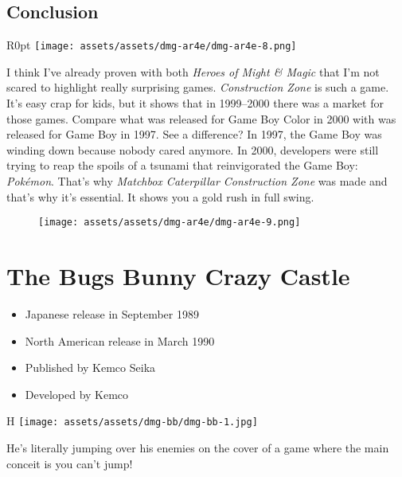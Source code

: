 \documentclass{book}
\begin{document}
\FloatBarrier\needspace{5pt}\section*{Conclusion}\nopagebreak[4]

\begin{wrapfigure}{R}{0pt} \texttt{[image: assets/assets/dmg-ar4e/dmg-ar4e-8.png]}\end{wrapfigure}
I think I’ve already proven with both \emph{Heroes of Might \& Magic} that I’m not scared to highlight really surprising games. \emph{Construction Zone} is such a game. It’s easy crap for kids, but it shows that in 1999–2000 there was a market for those games. Compare what was released for Game Boy Color in 2000 with was released for Game Boy in 1997. See a difference? In 1997, the Game Boy was winding down because nobody cared anymore. In 2000, developers were still trying to reap the spoils of a tsunami that reinvigorated the Game Boy: \emph{Pokémon}. That’s why \emph{Matchbox Caterpillar Construction Zone} was made and that’s why it’s essential. It shows you a gold rush in full swing.

\begin{figure}[hbt]
\vskip 10pt
\centering \texttt{[image: assets/assets/dmg-ar4e/dmg-ar4e-9.png]}
\vskip 6pt
\end{figure}


\begingroup \chapter*{The Bugs Bunny Crazy Castle} \endgroup

\begin{itemize} \setlength\itemsep{-0.4em}
\item Japanese release in September 1989
\item North American release in March 1990
\item Published by Kemco Seika
\item Developed by Kemco
\end{itemize}\noindent

\begin{wrapfigure}{H}{\linewidth}
\vskip 4pt
\centering \texttt{[image: assets/assets/dmg-bb/dmg-bb-1.jpg]}\par\pagetwodescription He’s literally jumping over his enemies on the cover of a game where the main conceit is you can’t jump!\end{wrapfigure}
\clearpage
\end{document}

